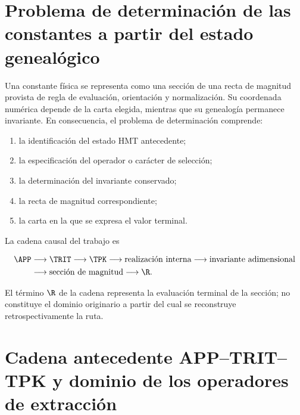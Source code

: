 \label{chap:p3-83-23-algebra_clasificacion}





\label{p3-83-c23-s1:ch:foundation}

\section{Problema de determinación de las constantes a partir del estado genealógico}

Una constante f\'isica se representa como una secci\'on de una recta de
magnitud provista de regla de evaluaci\'on, orientaci\'on y normalizaci\'on.
Su coordenada num\'erica depende de la carta elegida, mientras que su
genealog\'ia permanece invariante. En consecuencia, el problema de
determinaci\'on comprende:

\begin{enumerate}
\item la identificaci\'on del estado HMT antecedente;
\item la especificaci\'on del operador o car\'acter de selecci\'on;
\item la determinaci\'on del invariante conservado;
\item la recta de magnitud correspondiente;
\item la carta en la que se expresa el valor terminal.
\end{enumerate}

La cadena causal del trabajo es

\begin{equation}
\begin{aligned}
\APP&\longrightarrow\TRIT\longrightarrow\TPK
\longrightarrow\text{realizaci\'on interna}
\longrightarrow\text{invariante adimensional}\\
&\longrightarrow\text{secci\'on de magnitud}
\longrightarrow\R.
\end{aligned}
\label{p3-83-c23-s1:eq:master-chain}
\end{equation}

El t\'ermino \(\R\) de la cadena representa la evaluaci\'on terminal de la
secci\'on; no constituye el dominio originario a partir del cual se
reconstruye retrospectivamente la ruta.

\section{Cadena antecedente APP--TRIT--TPK y dominio de los operadores de extracción}


